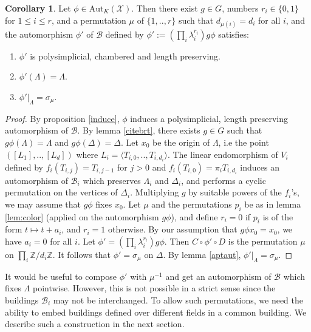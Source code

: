 \documentclass{amsart}
\theoremstyle{theorem}
\theoremstyle{lemma}
\theoremstyle{prop}
\theoremstyle{definition}
\theoremstyle{corollary}
\newtheorem{corollary}[lemma]{Corollary}
\theoremstyle{remark}
\newcommand{\Z}{\mathbb{Z}}
\newcommand{\B}{\mathcal{B}}
\newcommand{\X}{\mathcal{X}}
\newcommand{\Aut}{\text{Aut}}
\begin{document}
\begin{corollary} \label{normalform}
Let $\phi \in \Aut_K(\X)$. Then there exist $g\in G$, numbers $r_i \in \{0,1\}$ for $1\leq i \leq r$, and a permutation $\mu$ of $\{1,..,r\}$ such that $d_{\mu(i)}=d_i$ for all $i$, and the automorphism $\phi'$ of $\B$ defined by $\phi':=(\prod_i \lambda_i ^ {r_i}) g \phi$ satisfies:
\begin{enumerate}
\item
$\phi'$ is polysimplicial, chambered and length preserving.
\item
$\phi'(\Lambda)=\Lambda$.
\item
$\phi'|_\Lambda = \sigma_\mu$.
\end{enumerate}
\end{corollary}

\begin{proof}
By proposition \ref{induce}, $\phi$ induces a polysimplicial, length preserving automorphism of $\B$. By lemma \ref{citebrt}, there exists $g\in G$ such that $g \phi (\Lambda)=\Lambda$ and $g \phi (\Delta)=\Delta$. 
Let $x_0$ be the origin of $\Lambda$, i.e the point $([L_1],..,[L_d])$ where $L_i = \langle T_{i,0},..,T_{i,d_i} \rangle$.
The linear endomorphism of $V_i$ defined by $f_i(T_{i,j})= T_{i,j-1}$ for $j>0$ and $f_i(T_{i,0})=\pi_i T_{i,d_i}$  induces an automorphism of $\B_i$ which preserves $\Lambda_i$ and $\Delta_i$, and performs a cyclic permutation on the vertices of $\Delta_i$. Multiplying $g$ by suitable powers of the $f_i$'s, we may assume that $g \phi$ fixes $x_0$. 
Let $\mu$ and the permutations $p_i$ be as in lemma \ref{lem:color} (applied on the automorphism $g \phi$), and define $r_i=0$ if $p_i$ is of the form $t \mapsto t+a_i$, and $r_i=1$ otherwise. By our assumption that $g\phi x_0=x_0$, we have $a_i=0$ for all $i$. Let $\phi'=(\prod_i \lambda_i ^ {r_i}) g \phi$. Then $C\circ \phi' \circ D$ is the permutation $\mu$ on $\prod_i \Z / d_i \Z$. It follows that $\phi'=\sigma_\mu$ on $\Delta$. By lemma \ref{aptaut}, $\phi'|_\Lambda = \sigma_\mu$.
\end{proof}

It would be useful to compose $\phi'$ with $\mu^{-1}$ and get an automorphism of $\B$ which fixes $\Lambda$ pointwise. However, this is not possible in a strict sense since the buildings $\B_i$ may not be interchanged. To allow such permutations, we need the ability to embed buildings defined over different fields in a common building. We describe such a construction in the next section.

\end{document}
